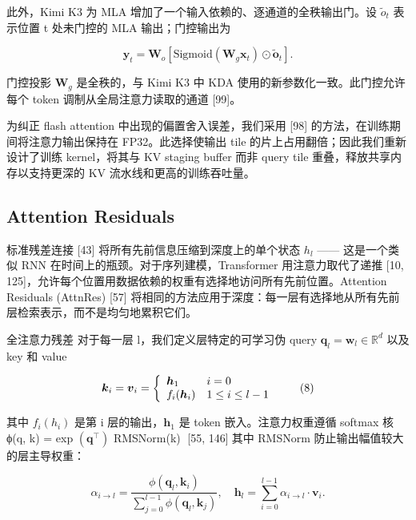 此外，Kimi K3 为 MLA 增加了一个输入依赖的、逐通道的全秩输出门。设 \({ \tilde { o } } _ { t }\) 表示位置 t 处未门控的 MLA 输出；门控输出为

\[
\boldsymbol {y} _ {t} = \mathbf {W} _ {o} [ \text {Sigmoid} (\mathbf {W} _ {g} \boldsymbol {x} _ {t}) \odot \tilde {\boldsymbol {o}} _ {t} ]  .\tag{7}
\]

门控投影 \(\mathbf { W } _ { g }\) 是全秩的，与 Kimi K3 中 KDA 使用的新参数化一致。此门控允许每个 token 调制从全局注意力读取的通道 {[}99{]}。

为纠正 flash attention 中出现的偏置舍入误差，我们采用 {[}98{]} 的方法，在训练期间将注意力输出保持在 FP32。此选择使输出 tile 的片上占用翻倍；因此我们重新设计了训练 kernel，将其与 KV staging buffer 而非 query tile 重叠，释放共享内存以支持更深的 KV 流水线和更高的训练吞吐量。

\subsection{Attention Residuals}\label{attention-residuals}

标准残差连接 {[}43{]} 将所有先前信息压缩到深度上的单个状态 \(h _ { l }\) —— 这是一个类似 RNN 在时间上的瓶颈。对于序列建模，Transformer 用注意力取代了递推 {[}10, 125{]}，允许每个位置用数据依赖的权重有选择地访问所有先前位置。Attention Residuals (AttnRes) {[}57{]} 将相同的方法应用于深度：每一层有选择地从所有先前层检索表示，而不是均匀地累积它们。

全注意力残差 对于每一层 l，我们定义层特定的可学习伪 query \(\pmb q _ { l } = \pmb w _ { l } \in \mathbb { R } ^ { d }\) 以及 key 和 value

\[
\boldsymbol {k} _ {i} = \boldsymbol {v} _ {i} = \left\{ \begin{array}{l l} \boldsymbol {h} _ {1} & i = 0 \\ f _ {i} (\boldsymbol {h} _ {i}) & 1 \leq i \leq l - 1 \end{array} \right.\tag{8}
\]

其中 \(f _ { i } ( h _ { i } )\) 是第 i 层的输出，\(\pmb { h } _ { 1 }\) 是 token 嵌入。注意力权重遵循 softmax 核 ϕ(q, k) = exp \(\left( \pmb q ^ { \top } \right)\) RMSNorm(k) {[}55, 146{]}，其中 RMSNorm 防止输出幅值较大的层主导权重：

\[
\alpha_ {i \rightarrow l} = \frac {\phi (\boldsymbol {q} _ {l} , \boldsymbol {k} _ {i})}{\sum_ {j = 0} ^ {l - 1} \phi (\boldsymbol {q} _ {l} , \boldsymbol {k} _ {j})}, \quad \boldsymbol {h} _ {l} = \sum_ {i = 0} ^ {l - 1} \alpha_ {i \rightarrow l} \cdot \boldsymbol {v} _ {i}.\tag{9}
\]

